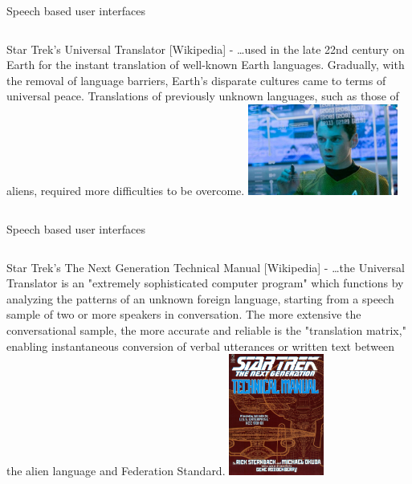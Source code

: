 \begin{frame}{Speech based user interfaces}{}
\begin{columns}[T]
    \column{2.5in}
     \alert{Star Trek's Universal Translator} [Wikipedia] -  \dots used in the late 22nd century on 
     Earth for the \alert{instant translation of well-known Earth languages}. Gradually, with 
     the removal of language barriers, Earth's disparate cultures came to terms of 
     universal peace. Translations of \alert{previously unknown languages}, such as those of 
     aliens, required more difficulties to be overcome. 
     \column{2in}
     \vspace{1cm}
     \includegraphics[height=30mm]{figures/startrek_comp}
  \end{columns}
\end{frame}

\begin{frame}{Speech based user interfaces}{}
\begin{columns}[T]
    \column{3in}
     \alert{Star Trek's The Next Generation Technical Manual} [Wikipedia] -  \dots the Universal Translator 
     is an "extremely sophisticated computer program" which functions by \alert{analyzing the patterns} of an unknown 
     foreign language, starting from \alert{a speech sample of two or more speakers in conversation}. The more extensive 
     the conversational sample, the more accurate and reliable is the "translation matrix," enabling instantaneous 
     conversion of verbal utterances or written text between the alien language and Federation Standard.
     \column{1in}
     \vspace{1.2cm}
     \includegraphics[height=40mm]{figures/startrek_manual}
  \end{columns}
\end{frame}

